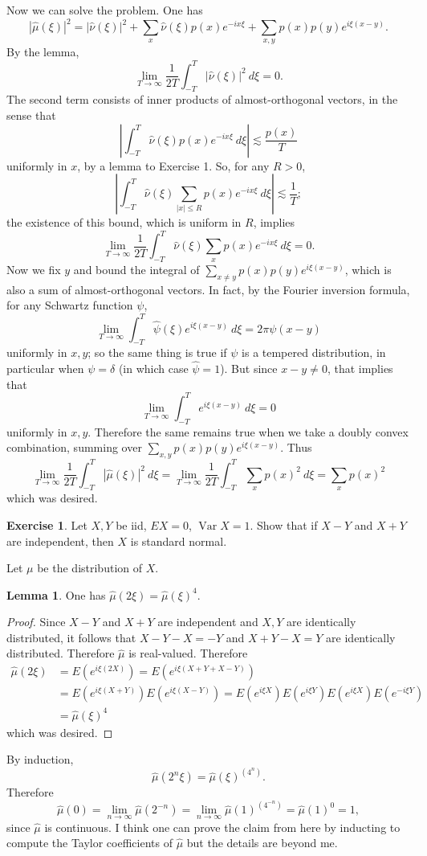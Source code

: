 \documentclass[10pt]{article}
\newcommand{\Var}{\operatorname{Var}}
\theoremstyle{definition}
\newtheorem{exer}{Exercise}
\newtheorem{lemma}{Lemma}[exer]
\begin{document}
Now we can solve the problem.
One has
$$|\hat \mu(\xi)|^2 = |\hat \nu(\xi)|^2 + \sum_x \hat \nu(\xi)p(x) e^{-ix\xi} + \sum_{x, y} p(x)p(y) e^{i\xi(x-y)}.$$
By the lemma,
$$\lim_{T \to \infty} \frac{1}{2T} \int_{-T}^T |\hat \nu(\xi)|^2~d\xi = 0.$$
The second term consists of inner products of almost-orthogonal vectors, in the sense that
$$\left|\int_{-T}^T \hat \nu(\xi) p(x) e^{-ix\xi} ~d\xi\right| \lesssim \frac{p(x)}{T}$$
uniformly in $x$, by a lemma to Exercise 1. So, for any $R > 0$,
$$\left|\int_{-T}^T \hat \nu(\xi) \sum_{|x| \leq R} p(x) e^{-ix\xi} ~d\xi\right| \lesssim \frac{1}{T};$$
the existence of this bound, which is uniform in $R$, implies
$$\lim_{T \to \infty} \frac{1}{2T} \int_{-T}^T \hat \nu(\xi) \sum_x p(x) e^{-ix\xi} ~d\xi = 0.$$
Now we fix $y$ and bound the integral of $\sum_{x \neq y} p(x) p(y) e^{i\xi(x-y)}$, which is also a sum of almost-orthogonal vectors. In fact, by the Fourier inversion formula, for any Schwartz function $\psi$,
$$\lim_{T \to \infty} \int_{-T}^T \widehat \psi(\xi) e^{i\xi(x-y)}~d\xi = 2\pi\psi(x - y)$$
uniformly in $x,y$; so the same thing is true if $\psi$ is a tempered distribution, in particular when $\psi = \delta$ (in which case $\widehat \psi = 1$). But since $x - y \neq 0$, that implies that
$$\lim_{T \to \infty} \int_{-T}^T e^{i\xi(x-y)}~d\xi = 0$$
uniformly in $x, y$. Therefore the same remains true when we take a doubly convex combination, summing over $\sum_{x, y} p(x)p(y) e^{i\xi(x-y)}$.
Thus
$$\lim_{T \to \infty} \frac{1}{2T} \int_{-T}^T |\hat \mu(\xi)|^2~d\xi = \lim_{T \to \infty} \frac{1}{2T} \int_{-T}^T \sum_x p(x)^2 ~d\xi = \sum_x p(x)^2$$
which was desired.

\begin{exer}
Let $X,Y$ be iid, $EX = 0$, $\Var X = 1$. Show that if $X - Y$ and $X + Y$ are independent, then $X$ is standard normal.
\end{exer}

Let $\mu$ be the distribution of $X$.

\begin{lemma}
One has $\hat \mu(2\xi) = \hat \mu(\xi)^4$.
\end{lemma}
\begin{proof}
Since $X - Y$ and $X + Y$ are independent and $X,Y$ are identically distributed, it follows that $X - Y - X = -Y$ and $X + Y - X = Y$ are identically distributed.
Therefore $\hat \mu$ is real-valued.
Therefore
\begin{align*}
\hat \mu(2\xi) &= E(e^{i\xi(2X)}) = E(e^{i\xi(X+Y+X-Y)})\\
&= E(e^{i\xi(X+Y)}) E(e^{i\xi(X-Y)}) = E(e^{i\xi X}) E(e^{i\xi Y}) E(e^{i\xi X}) E(e^{-i\xi Y})\\
&= \hat \mu(\xi)^4
\end{align*}
which was desired.
\end{proof}
By induction,
$$\hat \mu(2^n\xi) = \hat \mu(\xi)^{(4^n)}.$$
Therefore
$$\hat \mu(0) = \lim_{n \to \infty} \hat \mu(2^{-n}) = \lim_{n \to \infty} \hat \mu(1)^{(4^{-n})} = \hat \mu(1)^0 = 1,$$
since $\hat \mu$ is continuous.
I think one can prove the claim from here by inducting to compute the Taylor coefficients of $\hat \mu$ but the details are beyond me.
\end{document}
